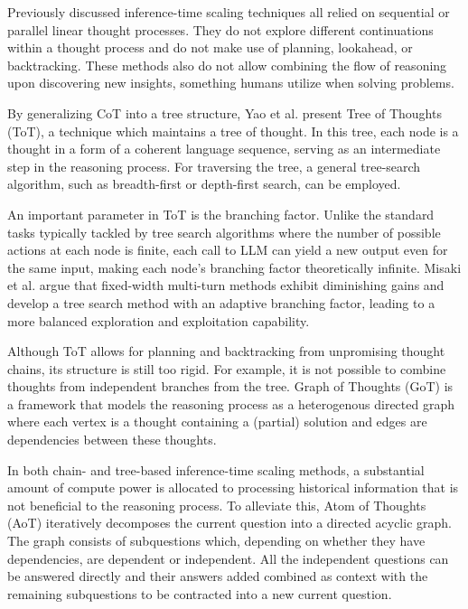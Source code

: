 Previously discussed inference-time scaling techniques all relied on sequential or parallel linear thought processes. 
They do not explore different continuations within a thought process and do not make use of 
planning, lookahead, or backtracking\cite{yao2023treethoughtsdeliberateproblem}. These methods also do not allow 
combining the flow of reasoning upon discovering new insights, something humans utilize when solving problems\cite{Besta_2024}.

By generalizing CoT\cite{wei2023chainofthoughtpromptingelicitsreasoning}\cite{NEURIPS2022_8bb0d291} into a tree structure,
Yao et al.\cite{yao2023treethoughtsdeliberateproblem} present Tree of Thoughts (ToT), a technique which maintains a tree of thought.
In this tree, each node is a thought in a form of a coherent language sequence, serving as an intermediate step
in the reasoning process. For traversing the tree, a general tree-search algorithm, such as breadth-first or depth-first search, can be employed.

An important parameter in ToT is the branching factor. Unlike the standard tasks typically tackled by tree search algorithms 
where the number of possible actions at each node is finite, each call to LLM can yield a new output even for 
the same input, making each node's branching factor theoretically infinite\cite{misaki2025widerdeeperscalingllm}.
Misaki et al.\cite{misaki2025widerdeeperscalingllm} argue that fixed-width multi-turn methods exhibit diminishing gains 
and develop a tree search method with an adaptive branching factor, leading to a more balanced exploration and exploitation capability. 

Although ToT allows for planning and backtracking from unpromising thought chains, its structure is still too rigid\cite{Besta_2024}.
For example, it is not possible to combine thoughts from independent branches from the tree. Graph of Thoughts\cite{Besta_2024} (GoT) is 
a framework that models the reasoning process as a heterogenous directed graph where each vertex is a thought containing a (partial) solution
and edges are dependencies between these thoughts\cite{Besta_2024}. 

In both chain- and tree-based inference-time scaling methods, a substantial amount of compute power is allocated to
processing historical information that is not beneficial to the reasoning process. To alleviate this,
Atom of Thoughts\cite{teng2025atomthoughtsmarkovllm} (AoT) iteratively decomposes the current question into a directed acyclic graph.
The graph consists of subquestions which, depending on whether they have dependencies, are dependent or independent.
All the independent questions can be answered directly and their answers added combined as context with the remaining subquestions
to be contracted into a new current question. 

